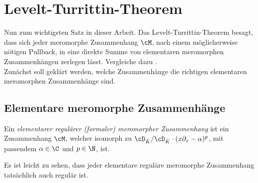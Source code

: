 \chapter{Levelt-\!Turrittin-\!Theorem}
Nun zum wichtigsten Satz in dieser Arbeit. Das Levelt-Turrittin-Theorem besagt,
dass sich jeder meromorphe Zusammenhang $\cM$, nach einem möglicherweise
nötigen Pullback, in eine direkte Summe von \glqq elementaren\grqq{}
meromorphen Zusammenhängen zerlegen lässt. Vergleiche dazu
\cite{sabbah_cimpa90}.\\
Zunächst soll geklärt werden, welche Zusammenhänge die \glqq richtigen\grqq{}
elementaren meromorphen Zusammenhänge sind.
\section{Elementare meromorphe Zusammenhänge}
\begin{defn}
Ein \emph{elementarer regulärer (formaler) meromorpher Zusammenhang} ist ein
Zusammenhang $\cM$, welcher isomorph zu $\cD_{\hat K}/\cD_{\hat K}\cdot
(x\partial_x-\alpha)^p$, mit passendem $\alpha\in \C$ und $p\in\N$, ist.
\end{defn}
\iffalse
\begin{figure}[htbp]
  \begin{center}
    \begin{tikzpicture}[scale=1,descr/.style={fill=white,inner sep=2.5pt}]
    \def\myPoints{}
    \def\myPath{ -- (3,0)}
    \myPlotFunction[nogrid]{\myPoints}{\myPath}{3}{0}{0}{
      $N((x\partial_x-\alpha)^p)$
    }

    \draw (3,0) -- (3,-.2);
    \node[below] at (3,-.2) {\footnotesize$p$};
    \end{tikzpicture}
  \end{center}
  \caption{Newton-Polygon zu Elementarem regulärem meromorphem Zusammenhang.}
\end{figure}
\fi
\begin{bem}
Es ist leicht zu sehen, dass jeder elementare reguläre meromorphe Zusammenhang
tatsächlich auch regulär ist.
\end{bem}

